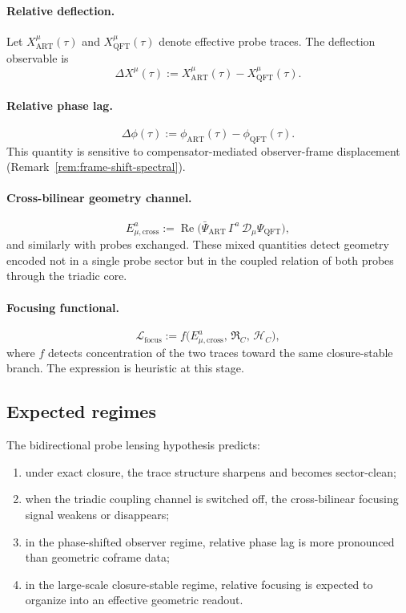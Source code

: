 \paragraph*{Relative deflection.}
Let $X^\mu_{\mathrm{ART}}(\tau)$ and $X^\mu_{\mathrm{QFT}}(\tau)$
denote effective probe traces. The deflection observable is
\[
  \Delta X^\mu(\tau)
  :=
  X^\mu_{\mathrm{ART}}(\tau) - X^\mu_{\mathrm{QFT}}(\tau).
\]

\paragraph*{Relative phase lag.}
\[
  \Delta\phi(\tau)
  :=
  \phi_{\mathrm{ART}}(\tau) - \phi_{\mathrm{QFT}}(\tau).
\]
This quantity is sensitive to compensator-mediated observer-frame
displacement (Remark~\ref{rem:frame-shift-spectral}).

\paragraph*{Cross-bilinear geometry channel.}
\[
  E^{a}_{\mu,\mathrm{cross}}
  :=
  \operatorname{Re}\bigl(
    \bar\Psi_{\mathrm{ART}}
    \,\Gamma^a\,
    \mathcal{D}_\mu
    \Psi_{\mathrm{QFT}}
  \bigr),
\]
and similarly with probes exchanged. These mixed quantities detect
geometry encoded not in a single probe sector but in the coupled
relation of both probes through the triadic core.

\paragraph*{Focusing functional.}
\[
  \mathcal{L}_{\mathrm{focus}}
  :=
  f\!\bigl(
    E^{a}_{\mu,\mathrm{cross}},\,
    \mathfrak{R}_C,\,
    \mathcal{H}_C
  \bigr),
\]
where $f$ detects concentration of the two traces toward the same
closure-stable branch. The expression is heuristic at this stage.

\subsection*{Expected regimes}

\begin{proposition}
\label{prop:expected-probe-lensing-behaviour}
The bidirectional probe lensing hypothesis predicts:
\begin{enumerate}[label=(\roman*)]
  \item under exact closure, the trace structure sharpens and becomes
        sector-clean;
  \item when the triadic coupling channel is switched off, the
        cross-bilinear focusing signal weakens or disappears;
  \item in the phase-shifted observer regime, relative phase lag is more
        pronounced than geometric coframe data;
  \item in the large-scale closure-stable regime, relative focusing is
        expected to organize into an effective geometric readout.
\end{enumerate}
\end{proposition}

